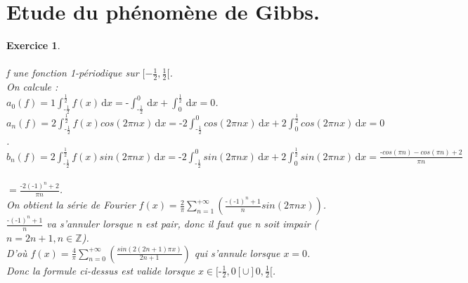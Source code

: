 \documentclass[a4paper,11pt]{article}
\newtheorem{exo}{Exercice}
\begin{document}
\section{Etude du phénomène de Gibbs.}

\begin{exo} \ \\ \\
f une fonction 1-périodique sur $ [-\frac{1}{2},\frac{1}{2}[ $. \ \\
On calcule : \ \\
$ a_0(f) = 1\int_{\text{-}\frac{1}{2}}^{\frac{1}{2}} f(x) \, \mathrm{d}x = \text{-}\int_{\text{-}\frac{1}{2}}^{0} \, \mathrm{d}x + \int_{0}^{\frac{1}{2}} \, \mathrm{d}x = 0 $. \ \\
$ a_n(f) = 2\int_{\text{-}\frac{1}{2}}^{\frac{1}{2}} f(x)cos(2\pi nx) \, \mathrm{d}x = \text{-}2\int_{\text{-}\frac{1}{2}}^{0} cos(2\pi nx) \, \mathrm{d}x + 2\int_{0}^{\frac{1}{2}} cos(2\pi nx) \, \mathrm{d}x = 0 $. \ \\
$ b_n(f) = 2\int_{\text{-}\frac{1}{2}}^{\frac{1}{2}} f(x)sin(2\pi nx) \, \mathrm{d}x = \text{-}2\int_{\text{-}\frac{1}{2}}^{0} sin(2\pi nx) \, \mathrm{d}x + 2\int_{0}^{\frac{1}{2}} sin(2\pi nx) \, \mathrm{d}x = \frac{\text{-}cos(\pi n)-cos(\pi n)+2}{\pi n} $ \ \\
\text{\enspace\enspace\enspace\space\space} $ = \frac{\text{-}2(\text{-}1)^n+2}{\pi n} $. \ \\
On obtient la série de Fourier $ f(x) = \frac{2}{\pi}\sum_{n=1}^{\text{+}\infty} \left(\frac{\text{-}(\text{-}1)^n+1}{n}sin(2\pi n x) \right) $. \ \\
$ \frac{\text{-}(\text{-}1)^n+1}{n} $ va s'annuler lorsque n est pair, donc il faut que n soit impair ($ n = 2n+1, n\in\mathbb{Z} $). \ \\
D'où $ f(x) = \frac{4}{\pi}\sum_{n=0}^{\text{+}\infty} \left(\frac{sin(2(2n+1)\pi x)}{2n+1} \right) $ qui s'annule lorsque $ x = 0 $. \ \\
Donc la formule ci-dessus est valide lorsque $ x\in[\text{-}\frac{1}{2},0[\cup]0,\frac{1}{2}[ $.
\end{exo}
\end{document}
